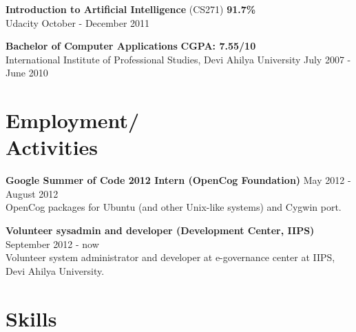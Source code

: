 \documentclass[margin,line]{resume}
\begin{document}
\begin{resume}
    \begin{list2}
	\item \textbf{Introduction to Artificial Intelligence} (CS271) \hspace{70mm} \textbf{91.7\%} \\ Udacity \hspace{108mm} October - December 2011
	\end{list2}
    
	\begin{list2}
	\item \textbf{Bachelor of Computer Applications} \hspace{70mm} \textbf{CGPA: 7.55/10} \\ International Institute of Professional Studies, Devi Ahilya University \hspace{20mm} July 2007 - June 2010
	\end{list2}

    \section{\mysidestyle Employment/ \\ Activities}

    \begin{list2}
	\item \textbf{Google Summer of Code 2012 Intern (OpenCog Foundation)} \hspace{15mm} May 2012 - August 2012 \\ OpenCog packages for Ubuntu (and other Unix-like systems) and Cygwin port.
	\item \textbf{Volunteer sysadmin and developer (Development Center, IIPS)} \hspace{12mm} September 2012 - now \\ Volunteer system administrator and developer at e-governance center at IIPS, Devi Ahilya University.
	\end{list2}

    \section{\mysidestyle Skills} 


\end{resume}
\end{document}

